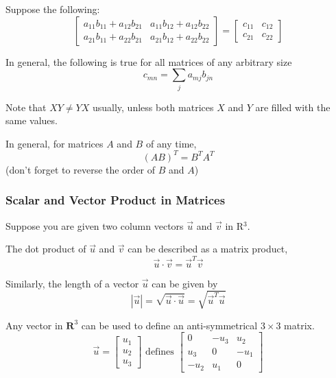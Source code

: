 \documentclass[a4paper]{article}
\theoremstyle{remark}
\theoremstyle{theorem}
\begin{document}
Suppose the following:
\begin{equation}
	\begin{bmatrix}
	a_{11}b_{11} + a_{12}b_{21} & a_{11}b_{12} + a_{12}b_{22} \\
	a_{21}b_{11} + a_{22}b_{21} & a_{21}b_{12} + a_{22}b_{22}
	\end{bmatrix}
	=
	\begin{bmatrix}
	c_{11} & c_{12} \\
	c_{21} & c_{22}
	\end{bmatrix}
\end{equation}

In general, the following is true for all matrices of any arbitrary size
\begin{equation}
	c_{mn} = \sum_j a_{mj}b_{jn}
\end{equation}

Note that $XY \neq YX$ usually, unless both matrices $X$ and $Y$ are filled with the same values.

In general, for matrices $A$ and $B$ of any time,
\begin{equation}
	(AB)^T = B^TA^T
\end{equation}
(don't forget to reverse the order of $B$ and $A$)

\subsubsection{Scalar and Vector Product in Matrices}
Suppose you are given two column vectors $\vec{u}$ and $\vec{v}$ in R$^3$.

The dot product of $\vec{u}$ and $\vec{v}$ can be described as a matrix product,
\begin{equation}
	\vec{u}\cdot\vec{v} = \vec{u}^T\vec{v}
\end{equation}

Similarly, the length of a vector $\vec{u}$ can be given by
\begin{equation}
	|\vec{u}| = \sqrt{\vec{u}\cdot\vec{u}} = \sqrt{\vec{u}^T\vec{u}}
\end{equation}

Any vector in $\mathbf{R}^3$ can be used to define an anti-symmetrical $3\times 3$ matrix.
\begin{equation}
	\vec{u}
	=
	\begin{bmatrix}
		u_1 \\
		u_2 \\
		u_3
	\end{bmatrix}
	\text{ defines }
	\begin{bmatrix}
		0	& -u_3	& u_2 \\
		u_3	& 0		& -u_1 \\
		-u_2& u_1 	& 0
	\end{bmatrix}
\end{equation}
\end{document}
